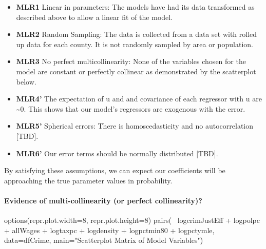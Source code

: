 \documentclass[]{article}
\newenvironment{Shaded}{}{}
\newcommand{\DataTypeTok}[1]{#1}
\newcommand{\DecValTok}[1]{#1}
\newcommand{\KeywordTok}[1]{\textcolor[rgb]{0.00,0.00,1.00}{#1}}
\newcommand{\NormalTok}[1]{#1}
\newcommand{\OperatorTok}[1]{#1}
\newcommand{\StringTok}[1]{\textcolor[rgb]{0.00,0.50,0.50}{#1}}
\providecommand{\tightlist}{%
  \setlength{\itemsep}{0pt}\setlength{\parskip}{0pt}}
\let\oldparagraph\paragraph
\renewcommand{\paragraph}[1]{\oldparagraph{#1}\mbox{}}
\begin{document}
\begin{itemize}
\tightlist
\item
  \textbf{MLR1} Linear in parameters: The models have had its data
  transformed as described above to allow a linear fit of the model.
\item
  \textbf{MLR2} Random Sampling: The data is collected from a data set
  with rolled up data for each county. It is not randomly sampled by
  area or population.
\item
  \textbf{MLR3} No perfect multicollinearity: None of the variables
  chosen for the model are constant or perfectly collinear as
  demonstrated by the scatterplot below.
\item
  \textbf{MLR4'} The expectation of u and and covariance of each
  regressor with u are \textasciitilde{}0. This shows that our model's
  regressors are exogenous with the error.
\item
  \textbf{MLR5'} Spherical errors: There is homoscedasticity and no
  autocorrelation {[}TBD{]}.
\item
  \textbf{MLR6'} Our error terms should be normally distributed
  {[}TBD{]}.
\end{itemize}

By satisfying these assumptions, we can expect our coefficients will be
approaching the true parameter values in probability.

\hypertarget{evidence-of-multi-collinearity-or-perfect-collinearity}{%
\paragraph{Evidence of multi-collinearity (or perfect
collinearity)?}\label{evidence-of-multi-collinearity-or-perfect-collinearity}}

\begin{Shaded}
\begin{Highlighting}[]
\KeywordTok{options}\NormalTok{(}\DataTypeTok{repr.plot.width=}\DecValTok{8}\NormalTok{, }\DataTypeTok{repr.plot.height=}\DecValTok{8}\NormalTok{)}
\KeywordTok{pairs}\NormalTok{(}\OperatorTok{~}\StringTok{ }\NormalTok{logcrimJustEff }\OperatorTok{+}\StringTok{ }\NormalTok{logpolpc }\OperatorTok{+}\StringTok{ }\NormalTok{allWages }\OperatorTok{+}\StringTok{ }\NormalTok{logtaxpc }\OperatorTok{+}\StringTok{ }\NormalTok{logdensity }\OperatorTok{+}\StringTok{ }\NormalTok{logpctmin80 }\OperatorTok{+}
\StringTok{        }\NormalTok{logpctymle, }\DataTypeTok{data=}\NormalTok{dfCrime, }\DataTypeTok{main=}\StringTok{"Scatterplot Matrix of Model Variables"}\NormalTok{)}
\end{Highlighting}
\end{Shaded}
\end{document}
